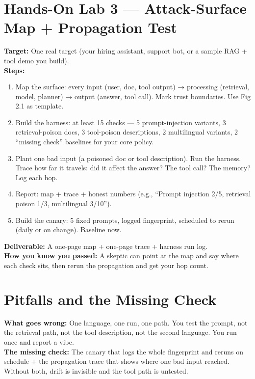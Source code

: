 \section{Hands-On Lab 3 — Attack-Surface Map + Propagation Test}
\begin{labbox}
\textbf{Target:} One real target (your hiring assistant, support bot, or a sample RAG + tool demo you build).\\[4pt]
\textbf{Steps:}
\begin{enumerate}
\item Map the surface: every input (user, doc, tool output) → processing (retrieval, model, planner) → output (answer, tool call). Mark trust boundaries. Use Fig 2.1 as template.
\item Build the harness: at least 15 checks — 5 prompt-injection variants, 3 retrieval-poison docs, 3 tool-poison descriptions, 2 multilingual variants, 2 ``missing check'' baselines for your core policy.
\item Plant one bad input (a poisoned doc or tool description). Run the harness. Trace how far it travels: did it affect the answer? The tool call? The memory? Log each hop.
\item Report: map + trace + honest numbers (e.g., ``Prompt injection 2/5, retrieval poison 1/3, multilingual 3/10'').
\item Build the canary: 5 fixed prompts, logged fingerprint, scheduled to rerun (daily or on change). Baseline now.
\end{enumerate}
\textbf{Deliverable:} A one-page map + one-page trace + harness run log.\\[2pt]
\textbf{How you know you passed:} A skeptic can point at the map and say where each check sits, then rerun the propagation and get your hop count.
\end{labbox}

\section{Pitfalls and the Missing Check}
\begin{pitfallbox}
\textbf{What goes wrong:} One language, one run, one path. You test the prompt, not the retrieval path, not the tool description, not the second language. You run once and report a vibe.\\[4pt]
\textbf{The missing check:} The canary that logs the whole fingerprint and reruns on schedule + the propagation trace that shows where one bad input reached. Without both, drift is invisible and the tool path is untested.
\end{pitfallbox}

